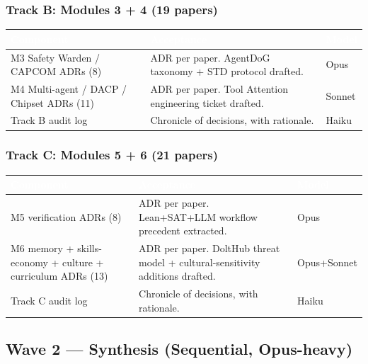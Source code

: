 \documentclass[11pt,letterpaper]{article}
\newcommand{\tableheader}[1]{\textbf{\sffamily\textcolor{white}{#1}}}
\begin{document}
\subsubsection{Track B: Modules 3 + 4 (19 papers)}

\begin{center}
\begin{tabularx}{\textwidth}{L{3.5cm}XC{1.5cm}}
\toprule
{}
\tableheader{Component} & \tableheader{Acceptance} & \tableheader{Model} \\
\midrule
M3 Safety Warden / CAPCOM ADRs (8) & ADR per paper. AgentDoG taxonomy + STD protocol drafted. & Opus \\
M4 Multi-agent / DACP / Chipset ADRs (11) & ADR per paper. Tool Attention engineering ticket drafted. & Sonnet \\
Track B audit log & Chronicle of decisions, with rationale. & Haiku \\
\bottomrule
\end{tabularx}
\end{center}

\subsubsection{Track C: Modules 5 + 6 (21 papers)}

\begin{center}
\begin{tabularx}{\textwidth}{L{3.5cm}XC{1.5cm}}
\toprule
{}
\tableheader{Component} & \tableheader{Acceptance} & \tableheader{Model} \\
\midrule
M5 verification ADRs (8) & ADR per paper. Lean+SAT+LLM workflow precedent extracted. & Opus \\
M6 memory + skills-economy + culture + curriculum ADRs (13) & ADR per paper. DoltHub threat model + cultural-sensitivity additions drafted. & Opus+Sonnet \\
Track C audit log & Chronicle of decisions, with rationale. & Haiku \\
\bottomrule
\end{tabularx}
\end{center}

\subsection{Wave 2 --- Synthesis (Sequential, Opus-heavy)}
\end{document}
